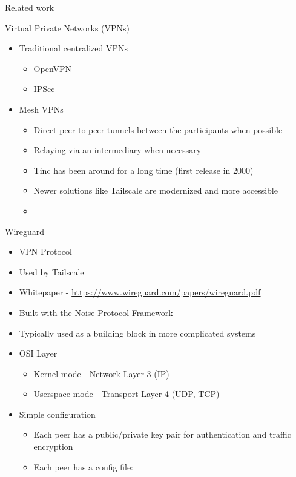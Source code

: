 \begin{frame}[fragile]{Related work}
\begin{block}{Virtual Private Networks (VPNs)}
\protect\hypertarget{virtual-private-networks-vpns}{}
\begin{itemize}
\tightlist
\item
  Traditional centralized VPNs

  \begin{itemize}
  \tightlist
  \item
    OpenVPN
  \item
    IPSec
  \end{itemize}
\item
  Mesh VPNs

  \begin{itemize}
  \tightlist
  \item
    Direct peer-to-peer tunnels between the participants when possible
  \item
    Relaying via an intermediary when necessary
  \item
    Tinc has been around for a long time (first release in 2000)
  \item
    Newer solutions like Tailscale are modernized and more accessible
  \item
  \end{itemize}
\end{itemize}
\end{block}

\begin{block}{Wireguard}
\protect\hypertarget{wireguard}{}
\begin{itemize}
\tightlist
\item
  VPN Protocol
\item
  Used by Tailscale
\item
  Whitepaper - \url{https://www.wireguard.com/papers/wireguard.pdf}
\item
  Built with the \href{notes/02022-noise.md}{Noise Protocol Framework}
\item
  Typically used as a building block in more complicated systems
\item
  OSI Layer

  \begin{itemize}
  \tightlist
  \item
    Kernel mode - Network Layer 3 (IP)
  \item
    Userspace mode - Transport Layer 4 (UDP, TCP)
  \end{itemize}
\item
  Simple configuration

  \begin{itemize}
  \item
    Each peer has a public/private key pair for authentication and
    traffic encryption
  \item
    Each peer has a config file:


\end{itemize}
\end{itemize}
\end{block}
\end{frame}
